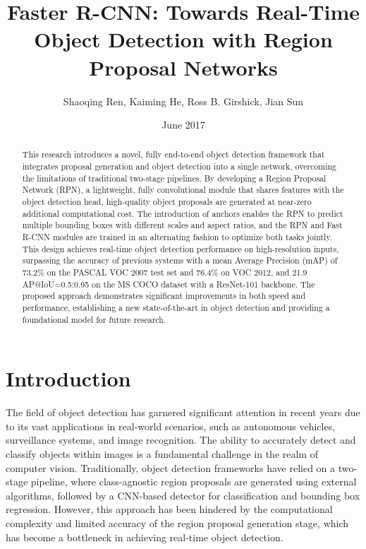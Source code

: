 \documentclass{article}
\begin{document}
\title{Faster R-CNN: Towards Real-Time Object Detection with Region Proposal Networks}
\author{Shaoqing Ren, Kaiming He, Ross B. Girshick, Jian Sun}
\date{June 2017}
\maketitle

\begin{abstract}
This research introduces a novel, fully end-to-end object detection framework that integrates proposal generation and object detection into a single network, overcoming the limitations of traditional two-stage pipelines. By developing a Region Proposal Network (RPN), a lightweight, fully convolutional module that shares features with the object detection head, high-quality object proposals are generated at near-zero additional computational cost. The introduction of anchors enables the RPN to predict multiple bounding boxes with different scales and aspect ratios, and the RPN and Fast R-CNN modules are trained in an alternating fashion to optimize both tasks jointly. This design achieves real-time object detection performance on high-resolution inputs, surpassing the accuracy of previous systems with a mean Average Precision (mAP) of 73.2\% on the PASCAL VOC 2007 test set and 76.4\% on VOC 2012, and 21.9 AP@IoU=0.5:0.95 on the MS COCO dataset with a ResNet-101 backbone. The proposed approach demonstrates significant improvements in both speed and performance, establishing a new state-of-the-art in object detection and providing a foundational model for future research.
\end{abstract}

\section{Introduction}
The field of object detection has garnered significant attention in recent years due to its vast applications in real-world scenarios, such as autonomous vehicles, surveillance systems, and image recognition. The ability to accurately detect and classify objects within images is a fundamental challenge in the realm of computer vision. Traditionally, object detection frameworks have relied on a two-stage pipeline, where class-agnostic region proposals are generated using external algorithms, followed by a CNN-based detector for classification and bounding box regression. However, this approach has been hindered by the computational complexity and limited accuracy of the region proposal generation stage, which has become a bottleneck in achieving real-time object detection.
\end{document}
